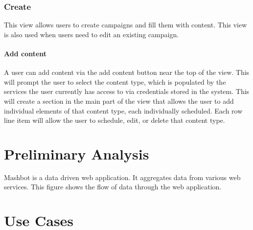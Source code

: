 \documentclass{article}
\begin{document}
        \subsubsection{Create}
        This view allows users to create campaigns and fill them with content.  This view is also used when users need to edit an existing campaign.
        \paragraph{Add content}
        A user can add content via the add content button near the top of the view.  This will prompt the user to select the content type, which is populated by the services the user currently has access to via credentials stored in the system. This will create a section in the main part of the view that allows the user to add individual elements of that content type, each individually scheduled.  Each row line item will allow the user to schedule, edit, or delete that content type.

\section{Preliminary Analysis} %
Mashbot is a data driven web application.  It aggregates data from various web services.  This figure shows the flow of data through the web application.

\section{Use Cases} %



    
  
\end{document}
